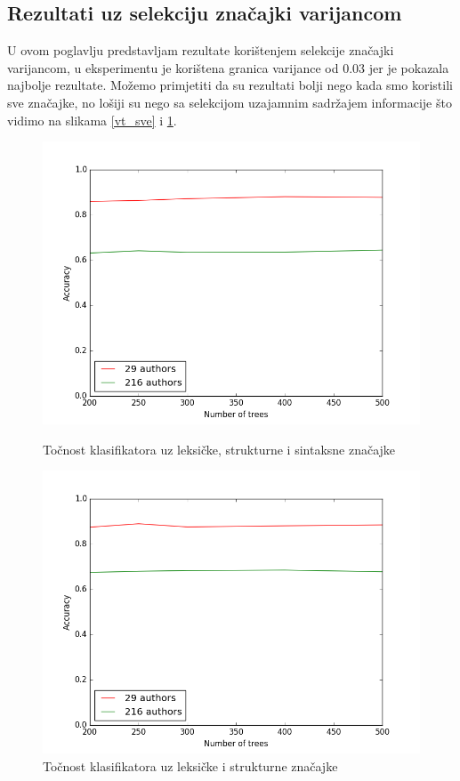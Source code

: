 \subsection{Rezultati uz selekciju značajki varijancom}

U ovom poglavlju predstavljam rezultate korištenjem selekcije značajki varijancom, u eksperimentu je korištena granica varijance od $0.03$ jer je pokazala najbolje rezultate. Možemo primjetiti da su rezultati bolji nego kada smo koristili sve značajke, no lošiji su nego sa selekcijom uzajamnim sadržajem informacije što vidimo na slikama \ref{vt_sve} i \ref{vt_leksicke}.

\begin{figure}[H]
  \centering
  \begin{minipage}[b]{0.49\textwidth}
    \includegraphics[width=\textwidth]{fig/vt_sve.png}
    \caption{Točnost klasifikatora uz leksičke, strukturne i sintaksne značajke}
    \label{vt_sve}
  \end{minipage}
  \hfill
  \begin{minipage}[b]{0.49\textwidth}
    \includegraphics[width=\textwidth]{fig/leksicke_vt.png}
    \caption{Točnost klasifikatora uz leksičke i strukturne značajke}
    \label{vt_leksicke}
  \end{minipage}
\end{figure}

